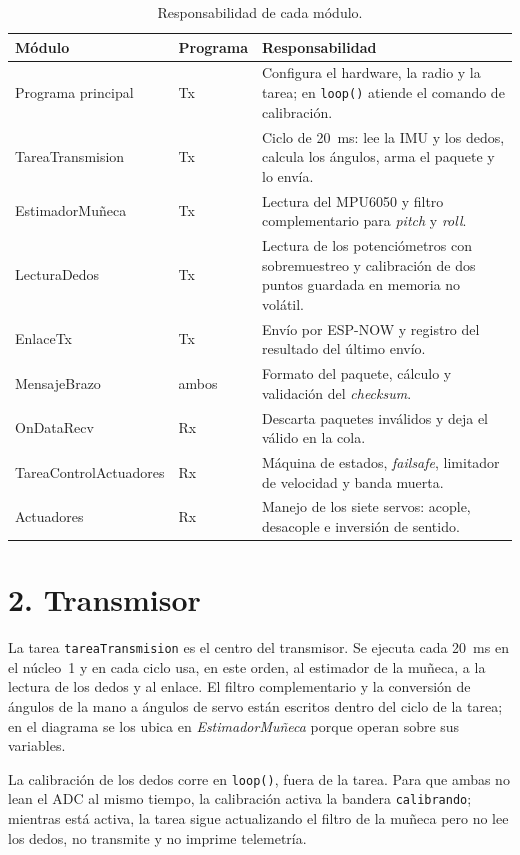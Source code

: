 \documentclass[11pt,a4paper]{article}
\begin{document}
\begin{table}[H]
\centering
\small
\begin{tabularx}{\textwidth}{l l X}
\toprule
\textbf{Módulo} & \textbf{Programa} & \textbf{Responsabilidad} \\
\midrule
Programa principal & Tx & Configura el hardware, la radio y la tarea; en \texttt{loop()} atiende el comando de calibración. \\
TareaTransmision & Tx & Ciclo de \SI{20}{ms}: lee la IMU y los dedos, calcula los ángulos, arma el paquete y lo envía. \\
EstimadorMuñeca & Tx & Lectura del MPU6050 y filtro complementario para \emph{pitch} y \emph{roll}. \\
LecturaDedos & Tx & Lectura de los potenciómetros con sobremuestreo y calibración de dos puntos guardada en memoria no volátil. \\
EnlaceTx & Tx & Envío por ESP-NOW y registro del resultado del último envío. \\
MensajeBrazo & ambos & Formato del paquete, cálculo y validación del \emph{checksum}. \\
OnDataRecv & Rx & Descarta paquetes inválidos y deja el válido en la cola. \\
TareaControlActuadores & Rx & Máquina de estados, \emph{failsafe}, limitador de velocidad y banda muerta. \\
Actuadores & Rx & Manejo de los siete servos: acople, desacople e inversión de sentido. \\
\bottomrule
\end{tabularx}
\caption{Responsabilidad de cada módulo.}
\end{table}

\newpage
\section*{2. Transmisor}

La tarea \texttt{tareaTransmision} es el centro del transmisor. Se ejecuta cada \SI{20}{ms} en el núcleo~1 y en cada ciclo usa, en este orden, al estimador de la muñeca, a la lectura de los dedos y al enlace. El filtro complementario y la conversión de ángulos de la mano a ángulos de servo están escritos dentro del ciclo de la tarea; en el diagrama se los ubica en \emph{EstimadorMuñeca} porque operan sobre sus variables.

La calibración de los dedos corre en \texttt{loop()}, fuera de la tarea. Para que ambas no lean el ADC al mismo tiempo, la calibración activa la bandera \texttt{calibrando}; mientras está activa, la tarea sigue actualizando el filtro de la muñeca pero no lee los dedos, no transmite y no imprime telemetría.
\end{document}
